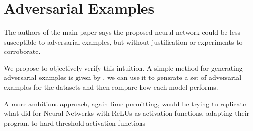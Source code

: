 \section{Adversarial Examples}\label{adversary}
\paragraph{}
The authors of the main paper says the proposed neural network could be less susceptible to adversarial examples, but without justification or experiments to corroborate.

We propose to objectively verify this intuition. A simple method for generating adversarial examples is given by \cite{goodfellow2014explaining}, we can use it to generate a set of adversarial examples for the datasets and then compare how each model performs.

A more ambitious approach, again time-permitting, would be trying to replicate what \cite{fischetti2017deep} did for Neural Networks with ReLUs as activation functions, adapting their program to hard-threshold activation functions